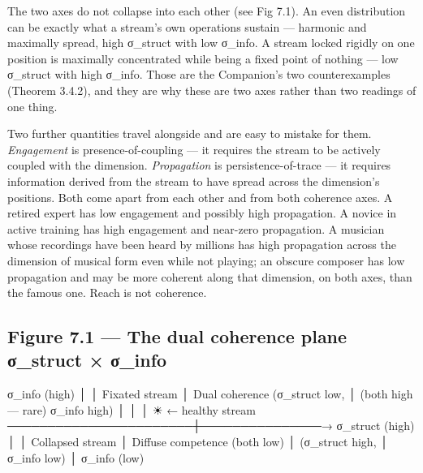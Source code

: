 \documentclass[11pt, openany]{book}
\begin{document}
The two axes do not collapse into each other (see Fig 7.1). An even distribution can be exactly what a stream's own operations sustain --- harmonic and maximally spread, high σ\_\allowbreak{}struct with low σ\_\allowbreak{}info. A stream locked rigidly on one position is maximally concentrated while being a fixed point of nothing --- low σ\_\allowbreak{}struct with high σ\_\allowbreak{}info. Those are the Companion's two counterexamples (Theorem 3.4.2), and they are why these are two axes rather than two readings of one thing.

Two further quantities travel alongside and are easy to mistake for them. \textit{Engagement} is presence-of-coupling --- it requires the stream to be actively coupled with the dimension. \textit{Propagation} is persistence-of-trace --- it requires information derived from the stream to have spread across the dimension's positions. Both come apart from each other and from both coherence axes. A retired expert has low engagement and possibly high propagation. A novice in active training has high engagement and near-zero propagation. A musician whose recordings have been heard by millions has high propagation across the dimension of musical form even while not playing; an obscure composer has low propagation and may be more coherent along that dimension, on both axes, than the famous one. Reach is not coherence.

\subsection{Figure 7.1 --- The dual coherence plane σ\_\allowbreak{}struct × σ\_\allowbreak{}info}

\begin{Code}
                      σ_info (high)
                          │
                          │
   Fixated stream         │     Dual coherence
   (σ_struct low,         │     (both high — rare)
    σ_info high)          │
                          │
                          │   ☀ ← healthy stream
   ───────────────────────┼───────────────→ σ_struct (high)
                          │
                          │
   Collapsed stream       │     Diffuse competence
   (both low)             │     (σ_struct high,
                          │      σ_info low)
                          │
                      σ_info (low)
\end{Code}
\end{document}
